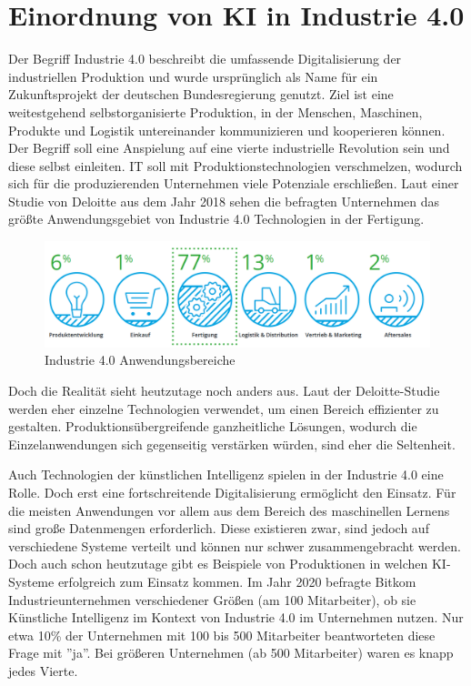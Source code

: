 \documentclass[a4paper,12pt, german]{report}
\begin{document}
\section{Einordnung von KI in Industrie 4.0}
Der Begriff Industrie 4.0 beschreibt die umfassende Digitalisierung der industriellen Produktion und wurde ursprünglich als Name für ein Zukunftsprojekt der deutschen Bundesregierung genutzt. Ziel ist eine weitestgehend selbstorganisierte Produktion, in der Menschen, Maschinen, Produkte und Logistik untereinander kommunizieren und kooperieren können. Der Begriff soll eine Anspielung auf eine vierte industrielle Revolution sein und diese selbst einleiten. IT soll mit Produktionstechnologien verschmelzen, wodurch sich für die produzierenden Unternehmen viele Potenziale erschließen.\cite{22} Laut einer Studie von Deloitte aus dem Jahr 2018 sehen die befragten Unternehmen das größte Anwendungsgebiet von Industrie 4.0 Technologien in der Fertigung.\cite{23}

\begin{figure}[H]
  \center
 \includegraphics[width=14cm]{images/deloitte.png}
  \caption[Industrie 4.0 Anwendungsbereiche]{Industrie 4.0 Anwendungsbereiche \cite{23}}
\end{figure}

Doch die Realität sieht heutzutage noch anders aus. Laut der Deloitte-Studie werden eher einzelne Technologien verwendet, um einen Bereich effizienter zu gestalten. Produktionsübergreifende ganzheitliche Lösungen, wodurch die Einzelanwendungen sich gegenseitig verstärken würden, sind eher die Seltenheit.\cite{23}

Auch Technologien der künstlichen Intelligenz spielen in der Industrie 4.0 eine Rolle. Doch erst eine fortschreitende Digitalisierung ermöglicht den Einsatz. Für die meisten Anwendungen vor allem aus dem Bereich des maschinellen Lernens sind große Datenmengen erforderlich. Diese existieren zwar, sind jedoch auf verschiedene Systeme verteilt und können nur schwer zusammengebracht werden. Doch auch schon heutzutage gibt es Beispiele von Produktionen in welchen KI-Systeme erfolgreich zum Einsatz kommen. Im Jahr 2020 befragte Bitkom Industrieunternehmen verschiedener Größen (am 100 Mitarbeiter), ob sie Künstliche Intelligenz im Kontext von Industrie 4.0 im Unternehmen nutzen. Nur etwa 10\% der Unternehmen mit 100 bis 500 Mitarbeiter beantworteten diese Frage mit ''ja''. Bei größeren Unternehmen (ab 500 Mitarbeiter) waren es knapp jedes Vierte.\cite{27} 
 
\end{document}
